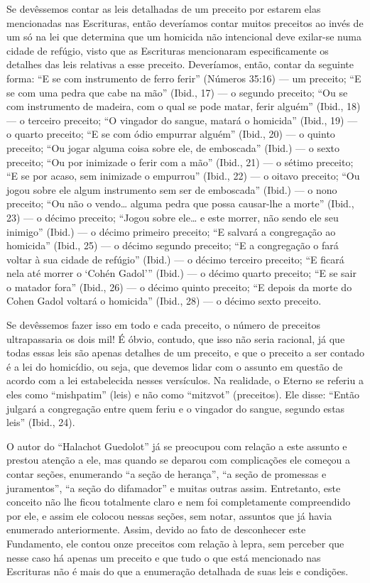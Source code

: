 Se devêssemos contar as leis detalhadas de um preceito por estarem elas
mencionadas nas Escrituras, então deveríamos contar muitos preceitos ao
invés de um só na lei que determina que um homicida não intencional deve
exilar-se numa cidade de refúgio, visto que as Escrituras mencionaram
especificamente os detalhes das leis relativas a esse preceito.
Deveríamos, então, contar da seguinte forma: ``E se com instrumento de
ferro ferir'' (Números 35:16) --- um preceito; ``E se com uma pedra que
cabe na mão'' (Ibid., 17) --- o segundo preceito; ``Ou se com
instrumento de madeira, com o qual se pode matar, ferir alguém'' (Ibid.,
18) --- o terceiro preceito; ``O vingador do sangue, matará o homicida''
(Ibid., 19) --- o quarto preceito; ``E se com ódio empurrar alguém''
(Ibid., 20) --- o quinto preceito; ``Ou jogar alguma coisa sobre ele, de
emboscada'' (Ibid.) --- o sexto preceito; ``Ou por inimizade o ferir
com a mão'' (Ibid., 21) --- o sétimo preceito; ``E se por acaso, sem inimizade o empurrou'' (Ibid., 22) --- o oitavo preceito; ``Ou jogou sobre ele algum instrumento sem ser  de emboscada'' (Ibid.) --- o nono preceito; ``Ou não o vendo\ldots{} alguma
  pedra que possa causar-lhe a morte'' (Ibid., 23) --- o décimo
  preceito; ``Jogou sobre ele\ldots{} e este morrer, não sendo ele seu
  inimigo'' (Ibid.) --- o décimo primeiro preceito; ``E salvará a
  congregação ao homicida'' (Ibid., 25) --- o décimo segundo preceito;
  ``E a congregação o fará voltar à sua cidade de refúgio'' (Ibid.) ---
  o décimo terceiro preceito; ``E ficará nela até morrer o `Cohén
  Gadol''' (Ibid.) --- o décimo quarto preceito; ``E se sair o matador fora'' (Ibid., 26) --- o décimo quinto preceito; ``E depois da morte do Cohen Gadol voltará o
homicida'' (Ibid., 28) --- o décimo sexto preceito.

Se devêssemos fazer isso em todo e cada preceito, o número de preceitos
ultrapassaria os dois mil! É óbvio, contudo, que isso não seria
racional, já que todas essas leis são apenas detalhes de um preceito, e
que o preceito a ser contado é a lei do homicídio, ou seja, que devemos
lidar com o assunto em questão de acordo com a lei estabelecida nesses
versículos. Na realidade, o Eterno se referiu a eles como ``mishpatim''
(leis) e não como ``mitzvot'' (preceitos). Ele disse: ``Então julgará a
congregação entre quem feriu e o vingador do sangue, segundo estas
leis'' (Ibid., 24).

O autor do ``Halachot Guedolot'' já se preocupou com relação a este
assunto e prestou atenção a ele, mas quando se deparou com complicações
ele começou a contar seções, enumerando ``a seção de herança'', ``a
seção de promessas e juramentos'', ``a seção do difamador'' e muitas
outras assim. Entretanto, este conceito não lhe ficou totalmente claro
e nem foi completamente compreendido por ele, e assim ele colocou
nessas seções, sem notar, assuntos que já havia enumerado
anteriormente. Assim, devido ao fato de desconhecer este Fundamento,
ele contou onze preceitos com relação à lepra, sem perceber que nesse
caso há apenas um preceito e que tudo o que está mencionado nas
Escrituras não é mais do que a enumeração detalhada de suas leis e
condições.

